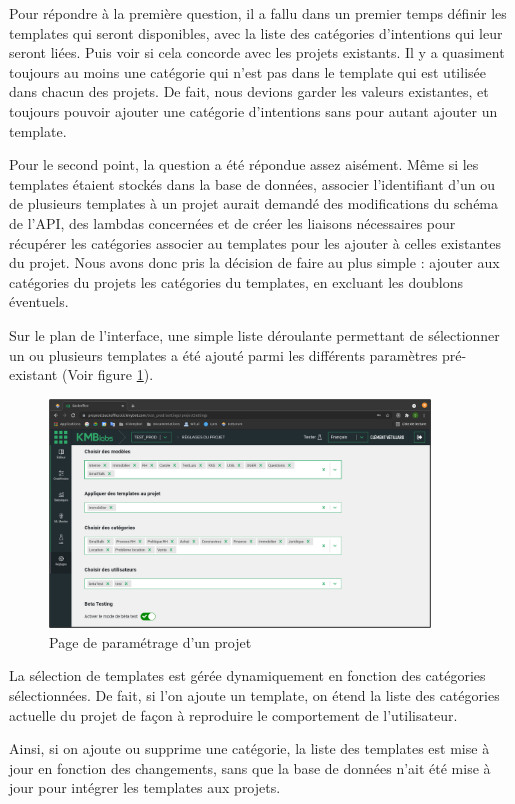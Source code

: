 \documentclass[12pt,a4paper,oneside]{scrreprt}
\begin{document}
Pour répondre à la première question, il a fallu dans un premier temps définir les templates qui seront disponibles, avec la liste des catégories d'intentions qui leur seront liées. Puis voir si cela concorde avec les projets existants. Il y a quasiment toujours au moins une catégorie qui n'est pas dans le template qui est utilisée dans chacun des projets. De fait, nous devions garder les valeurs existantes, et toujours pouvoir ajouter une catégorie d'intentions sans pour autant ajouter un template.

Pour le second point, la question a été répondue assez aisément. Même si les templates étaient stockés dans la base de données, associer l'identifiant d'un ou de plusieurs templates à un projet aurait demandé des modifications du schéma de l'API, des lambdas concernées et de créer les liaisons nécessaires pour récupérer les catégories associer au templates pour les ajouter à celles existantes du projet. Nous avons donc pris la décision de faire au plus simple : ajouter aux catégories du projets les catégories du templates, en excluant les doublons éventuels.

Sur le plan de l'interface, une simple liste déroulante permettant de sélectionner un ou plusieurs templates a été ajouté parmi les différents paramètres pré-existant (Voir figure \ref{fig:parameters}).

\begin{figure}[!ht]
	\centering
	\includegraphics[width=0.9\textwidth]{pictures/template_selector.png}
	\caption{Page de paramétrage d'un projet}
	\label{fig:parameters}
\end{figure}

\begin{result}
	La sélection de templates est gérée dynamiquement en fonction des catégories sélectionnées. De fait, si l'on ajoute un template, on étend la liste des catégories actuelle du projet de façon à reproduire le comportement de l'utilisateur.

	Ainsi, si on ajoute ou supprime une catégorie, la liste des templates est mise à jour en fonction des changements, sans que la base de données n'ait été mise à jour pour intégrer les templates aux projets.
\end{result}
\end{document}
